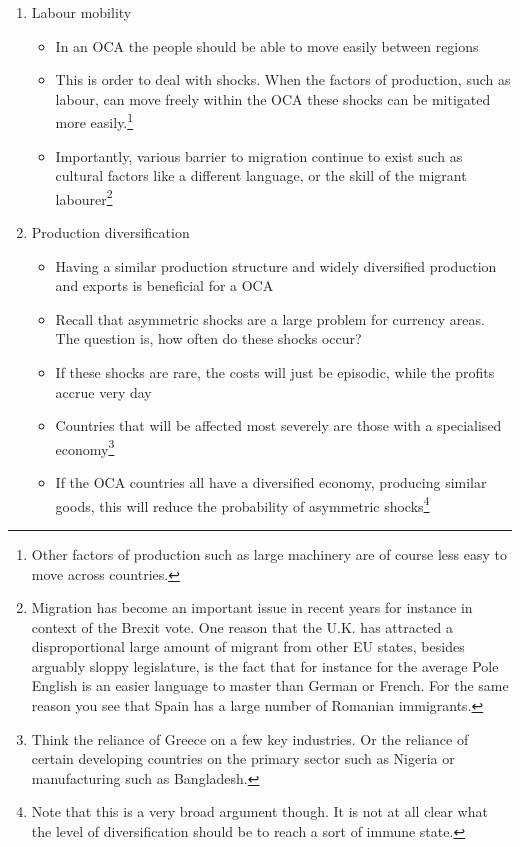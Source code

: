 \documentclass{tufte-handout}
\begin{document}
\begin{enumerate}
	\item Labour mobility
	\begin{itemize}
	  \item In an OCA the people should be able to move easily between regions
	  \item	This is order to deal with shocks. When the factors of production, such as labour, can move freely within the OCA these shocks can be mitigated more easily.\footnote{Other factors of production such as large machinery are of course less easy to move across countries.}
	  \item Importantly, various barrier to migration continue to exist such as cultural factors like a different language, or the skill of the migrant labourer\footnote{Migration has become an important issue in recent years for instance in context of the Brexit vote. One reason that the U.K. has attracted a disproportional large amount of migrant from other EU states, besides arguably sloppy legislature, is the fact that for instance for the average Pole English is an easier language to master than German or French. For the same reason you see that Spain has a large number of Romanian immigrants.}
	\end{itemize}

	\item Production diversification
	\begin{itemize}
	  \item Having a similar production structure and widely diversified production and exports is beneficial for a OCA
	  \item Recall that asymmetric shocks are a large problem for currency areas. The question is, how often do these shocks occur?
	  \item If these shocks are rare, the costs will just be episodic, while the profits accrue very day
	  \item Countries that will be affected most severely are those with a specialised economy\footnote{Think the reliance of Greece on a few key industries. Or the reliance of certain developing countries on the primary sector such as Nigeria or manufacturing such as Bangladesh.}
	  \item If the OCA countries all have a diversified economy, producing similar goods, this will reduce the probability of asymmetric shocks\footnote{Note that this is a very broad argument though. It is not at all clear what the level of diversification should be to reach a sort of immune state.}
	\end{itemize}


\end{enumerate}
\end{document}
